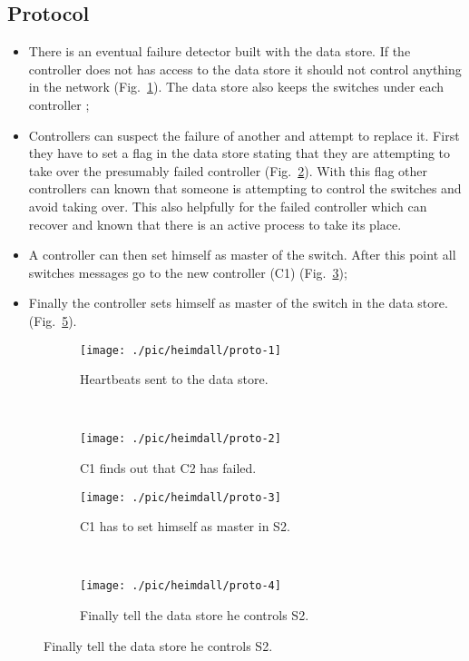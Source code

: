 \documentclass[12pt,openright,twoside]{report}
\begin{document}
\subsection{Protocol}
\begin{itemize}
\item There is an eventual failure detector built with the data store. If the controller does not has access to the data store it should not control anything in the network (Fig.~\ref{fig:proto-heartbeats}). The data store also keeps the switches under each controller ; 
\item Controllers can suspect the failure of another and attempt to replace it. First they have to set a flag in the data store stating that they are attempting to take over the presumably failed controller (Fig.~\ref{fig:proto-c2-fails}). With this flag other controllers can known that someone is attempting to control the switches and avoid taking over. This also helpfully for the failed controller which can recover and known that there is an active process to take its place. 
\item A controller can then set himself as master of the switch. After this point all switches messages go to the new controller (C1) (Fig.~\ref{fig:proto-c1-as-master}); 
\item Finally the controller sets himself as master of the switch in the data store. (Fig.~\ref{fig:proto-c1-finishes}). 
\end{itemize}


\begin{figure}
  \centering
  \begin{subfigure}[b]{0.5\textwidth}
                \centering
                \texttt{[image: ./pic/heimdall/proto-1]}
                \caption{Heartbeats sent to the data store. }
                \label{fig:proto-heartbeats}
        \end{subfigure}%
        ~
        \begin{subfigure}[b]{0.5\textwidth}
                \centering
                \texttt{[image: ./pic/heimdall/proto-2]}
                \caption{C1 finds out that C2 has failed.}
                \label{fig:proto-c2-fails}
        \end{subfigure}

  \begin{subfigure}[b]{0.5\textwidth}
                \centering
                \texttt{[image: ./pic/heimdall/proto-3]}
                \caption{C1 has to set himself as master in S2. }
                \label{fig:proto-c1-as-master}
        \end{subfigure}%
        ~
        \begin{subfigure}[b]{0.5\textwidth}
                \centering
                \texttt{[image: ./pic/heimdall/proto-4]}
                \caption{Finally tell the data store he controls S2. }
                \label{fig:proto-c1-finishes}
        \end{subfigure}
\end{figure}
\end{document}
